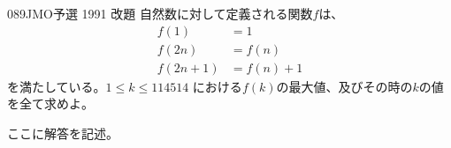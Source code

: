 \begin{thm}{089}{}{JMO予選 1991 改題}
 自然数に対して定義される関数$f$は、
 \begin{align*}
  f(1)&=1 \\
  f(2n)&=f(n) \\
  f(2n+1)&=f(n)+1
 \end{align*}
 を満たしている。$1\le k \le 114514$ における$f(k)$の最大値、及びその時の$k$の値を全て求めよ。
\end{thm}

ここに解答を記述。